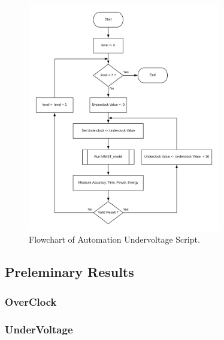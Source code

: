 \begin{figure}[!htb]
  \centering
  \includegraphics[width=0.75\textwidth]{Figures/Results/Underclock_Program.png}
  \caption[]{Flowchart of Automation Undervoltage Script.}
  \label{fig:undervoltage_program}
\end{figure}





\subsection{Preleminary Results}
\label{section:dvfseffects}

\subsubsection{OverClock}
\label{section:underclock}

\subsubsection{UnderVoltage}




